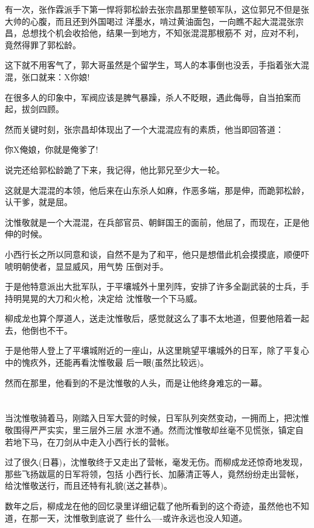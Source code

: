 \documentclass[11pt,a4paper,onecolumn]{article}
\begin{document}
有一次，张作霖派手下第一悍将郭松龄去张宗昌那里整顿军队，这位郭兄不但是张大帅的心腹，而且还到外国喝过
洋墨水，啃过黄油面包，一向瞧不起大混混张宗昌，总想找个机会收拾他，结果一到地方，不知张混混那根筋不
对，应对不利，竟然得罪了郭松龄。

这下就不用客气了，郭大哥虽然是个留学生，骂人的本事倒也没丢，手指着张大混混，张口就来：X你娘!

在很多人的印象中，军阀应该是脾气暴躁，杀人不眨眼，遇此侮辱，自当拍案而起，拔剑四顾。

然而关键时刻，张宗昌却体现出了一个大混混应有的素质，他当即回答道：

你X俺娘，你就是俺爹了!

说完还给郭松龄跪了下来，我记得，他比郭兄至少大一轮。

这就是大混混的本领，他后来在山东杀人如麻，作恶多端，那是伸，而跪郭松龄，认干爹，就是屈。

沈惟敬就是一个大混混，在兵部官员、朝鲜国王的面前，他屈了，而现在，正是他伸的时候。

小西行长之所以同意和谈，自然不是为了和平，他只是想借此机会摸摸底，顺便吓唬明朝使者，显显威风，用气势
压倒对手。

于是他特意派出大批军队，于平壤城外十里列阵，安排了许多全副武装的士兵，手持明晃晃的大刀和火枪，决定给
沈惟敬一个下马威。

柳成龙也算个厚道人，送走沈惟敬后，感觉就这么了事不太地道，但要他陪着一起去，他倒也不干。

于是他带人登上了平壤城附近的一座山，从这里眺望平壤城外的日军，除了平复心中的愧疚外，还能再看沈惟敬最
后一眼(虽然比较远)。

然而在那里，他看到的不是沈惟敬的人头，而是让他终身难忘的一幕。

\section[\thesection]{}

当沈惟敬骑着马，刚踏入日军大营的时候，日军队列突然变动，一拥而上，把沈惟敬围得严严实实，里三层外三层
水泄不通。然而沈惟敬却丝毫不见慌张，镇定自若地下马，在刀剑从中走入小西行长的营帐。

过了很久(日暮)，沈惟敬终于又走出了营帐，毫发无伤。而柳成龙还惊奇地发现，那些飞扬跋扈的日军将领，包括
小西行长、加藤清正等人，竟然纷纷走出营帐，给沈惟敬送行，而且还特有礼貌(送之甚恭)。

数年之后，柳成龙在他的回忆录里详细记载了他所看到的这个奇迹，虽然他也不知道，在那一天，沈惟敬到底说了
些什么----或许永远也没人知道。
\end{document}
